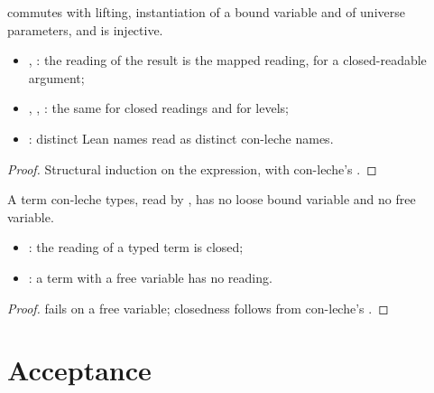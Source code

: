 \begin{lemma}
  \label{lem:EraseProof-toCL-instantiate1}
  \leanok
    commutes with lifting, instantiation of a bound variable and of universe parameters, and  is injective.
  \begin{itemize}
  \item {}, : the reading of the result is the mapped reading, for a closed-readable argument;
  \item {}, , : the same for closed readings and for levels;
  \item {}: distinct Lean names read as distinct con-leche names.
  \end{itemize}
\end{lemma}
\begin{proof}
  \leanok
   Structural induction on the expression, with con-leche's .
\end{proof}

\begin{lemma}
  \label{lem:EraseProof-CLTyped-closed}
  \leanok
   A term con-leche types, read by , has no loose bound variable and no free variable.
  \begin{itemize}
  \item {}: the reading of a typed term is closed;
  \item {}: a term with a free variable has no reading.
  \end{itemize}
\end{lemma}
\begin{proof}
  \leanok
    fails on a free variable; closedness follows from con-leche's .
\end{proof}

\section{Acceptance}\label{sec:bridge-accept}

